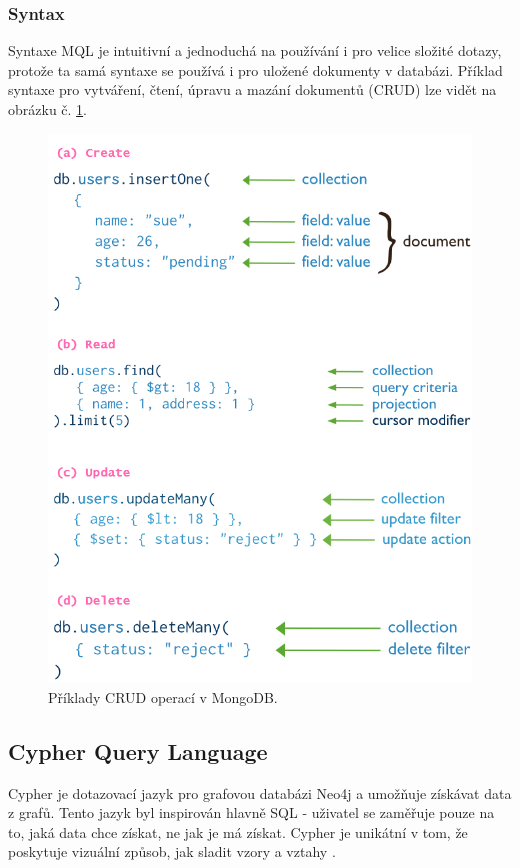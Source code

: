 \subsubsection{Syntax}
Syntaxe \gls{MQL} je intuitivní a jednoduchá na používání i pro velice složité dotazy, protože ta samá syntaxe se používá i pro uložené dokumenty v databázi. Příklad syntaxe pro vytváření, čtení, úpravu a mazání dokumentů (\gls{CRUD}) lze vidět na obrázku č. \ref{fig:crud}.
	\begin{figure}[H]
	\centering
	\includegraphics[width=12cm]{img/databaze/crud}
	\caption{Příklady \gls{CRUD} operací v MongoDB.}
	\label{fig:crud}
	\end{figure}

\subsection{Cypher Query Language}
Cypher je dotazovací jazyk pro grafovou databázi Neo4j a umožňuje získávat data z grafů. Tento jazyk byl inspirován hlavně \gls{SQL} - uživatel se zaměřuje pouze na to, jaká data chce získat, ne jak je má získat. Cypher je unikátní v tom, že poskytuje vizuální způsob, jak sladit vzory a vztahy \cite{cypher}.

